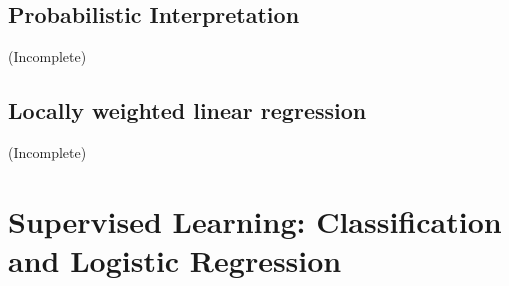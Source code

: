 \documentclass[letterpaper,10pt]{article}
\begin{document}
\subsection{Probabilistic Interpretation}

(Incomplete)

\subsection{Locally weighted linear regression}

(Incomplete)
	

\section{Supervised Learning: Classification and Logistic Regression}
\end{document}

